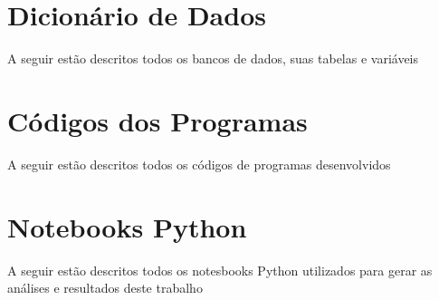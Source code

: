 
\begin{anexosenv}
    \partanexos
    \chapter{Dicionário de Dados}
    A seguir estão descritos todos os bancos de dados, suas tabelas e variáveis
    \chapter{Códigos dos Programas}
    A seguir estão descritos todos os códigos de programas desenvolvidos
    \chapter{Notebooks Python}
    A seguir estão descritos todos os notesbooks Python utilizados para gerar as análises e resultados deste trabalho

\end{anexosenv}